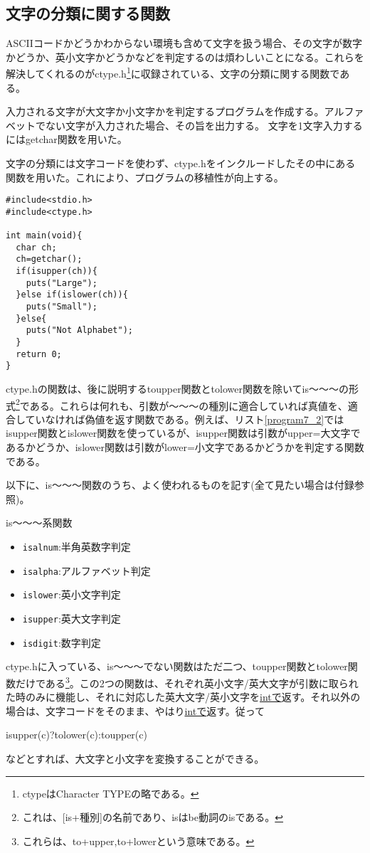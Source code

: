 \subsection{文字の分類に関する関数}
ASCIIコードかどうかわからない環境も含めて文字を扱う場合、その文字が数字かどうか、英小文字かどうかなどを判定するのは煩わしいことになる。これらを解決してくれるのがctype.h\footnote{ctypeはCharacter TYPEの略である。}に収録されている、文字の分類に関する関数である。
\begin{boxnote}
\begin{multicols}{2}
入力される文字が大文字か小文字かを判定するプログラムを作成する。アルファベットでない文字が入力された場合、その旨を出力する。
文字を1文字入力するにはgetchar関数を用いた。

文字の分類には文字コードを使わず、ctype.hをインクルードしたその中にある関数を用いた。これにより、プログラムの移植性が向上する。
\begin{lstlisting}[caption=文字の判定,label=program7_2]
#include<stdio.h>
#include<ctype.h>

int main(void){
  char ch; 
  ch=getchar();
  if(isupper(ch)){
    puts("Large"); 
  }else if(islower(ch)){
    puts("Small"); 
  }else{
    puts("Not Alphabet"); 
  }
  return 0; 
}
\end{lstlisting}
\end{multicols}
\end{boxnote}
ctype.hの関数は、後に説明するtoupper関数とtolower関数を除いてis〜〜〜の形式\footnote{これは、[is+種別]の名前であり、isはbe動詞のisである。}である。これらは何れも、引数が〜〜〜の種別に適合していれば真値を、適合していなければ偽値を返す関数である。例えば、リスト\ref{program7_2}ではisupper関数とislower関数を使っているが、isupper関数は引数がupper=大文字であるかどうか、islower関数は引数がlower=小文字であるかどうかを判定する関数である。

以下に、is〜〜〜関数のうち、よく使われるものを記す(全て見たい場合は付録参照)。
\begin{itembox}[l]{is〜〜〜系関数}
\begin{itemize}
\item \verb|isalnum|:半角英数字判定
\item \verb|isalpha|:アルファベット判定
\item \verb|islower|:英小文字判定
\item \verb|isupper|:英大文字判定
\item \verb|isdigit|:数字判定
\end{itemize}
\end{itembox}
ctype.hに入っている、is〜〜〜でない関数はただ二つ、toupper関数とtolower関数だけである\footnote{これらは、to+upper,to+lowerという意味である。}。この2つの関数は、それぞれ英小文字/英大文字が引数に取られた時のみに機能し、それに対応した英大文字/英小文字を\underline{intで}返す。それ以外の場合は、文字コードをそのまま、やはり\underline{intで}返す。従って
\begin{code}
isupper(c)?tolower(c):toupper(c)
\end{code}
などとすれば、大文字と小文字を変換することができる。

